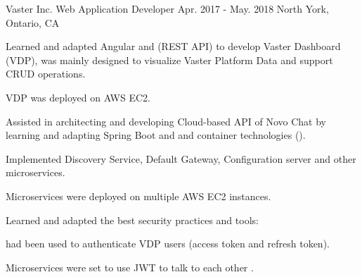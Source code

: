 \begin{cventries}
  \cventry
    {Vaster Inc.} %
    {Web Application Developer} %
    {Apr. 2017 - May. 2018} %
    {North York, Ontario, CA} %
    {
      \begin{cvitems} %
        \item {Learned and adapted Angular and  (REST API) to develop Vaster Dashboard (VDP), was mainly designed to visualize Vaster Platform Data and support CRUD operations.}
          \begin{cvsubitems}
            \item {VDP was deployed on AWS  EC2.}
          \end{cvsubitems}
        \item {Assisted in architecting and developing Cloud-based API of Novo Chat by learning and adapting Spring Boot and  and container technologies ().}
          \begin{cvsubitems}
            \item {Implemented Discovery Service, Default Gateway, Configuration server and other microservices.}
            \item {Microservices were deployed on multiple AWS  EC2 instances.}
          \end{cvsubitems}
        \item {Learned and adapted the best security practices and tools:}
          \begin{cvsubitems}
            \item { had been used to authenticate VDP users (access token and refresh token).}
            \item {Microservices were set to use JWT to talk to each other .}
          \end{cvsubitems}
      \end{cvitems}
    }

\end{cventries}
